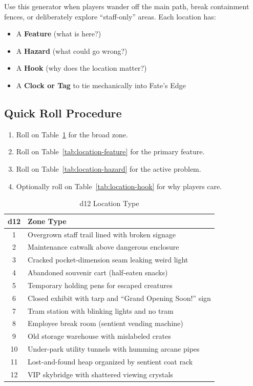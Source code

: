 \noindent
Use this generator when players wander off the main path, break containment fences, or deliberately explore ``staff-only'' areas. Each location has:
\begin{itemize}
  \item A \textbf{Feature} (what is here?)
  \item A \textbf{Hazard} (what could go wrong?)
  \item A \textbf{Hook} (why does the location matter?)
  \item A \textbf{Clock or Tag} to tie mechanically into Fate's Edge
\end{itemize}

\subsection*{Quick Roll Procedure}
\begin{enumerate}
  \item Roll on Table~\ref{tab:location-type} for the broad zone.
  \item Roll on Table~\ref{tab:location-feature} for the primary feature.
  \item Roll on Table~\ref{tab:location-hazard} for the active problem.
  \item Optionally roll on Table~\ref{tab:location-hook} for why players care.
\end{enumerate}

\vspace{0.5cm}

\begin{table}[h]
\centering
\caption{d12 Location Type}
\label{tab:location-type}
\begin{tabular}{@{}cl@{}}
\toprule
d12 & Zone Type \\
\midrule
1 & Overgrown staff trail lined with broken signage \\
2 & Maintenance catwalk above dangerous enclosure \\
3 & Cracked pocket-dimension seam leaking weird light \\
4 & Abandoned souvenir cart (half-eaten snacks) \\
5 & Temporary holding pens for escaped creatures \\
6 & Closed exhibit with tarp and ``Grand Opening Soon!'' sign \\
7 & Tram station with blinking lights and no tram \\
8 & Employee break room (sentient vending machine) \\
9 & Old storage warehouse with mislabeled crates \\
10 & Under-park utility tunnels with humming arcane pipes \\
11 & Lost-and-found heap organized by sentient coat rack \\
12 & VIP skybridge with shattered viewing crystals \\
\bottomrule
\end{tabular}
\end{table}

